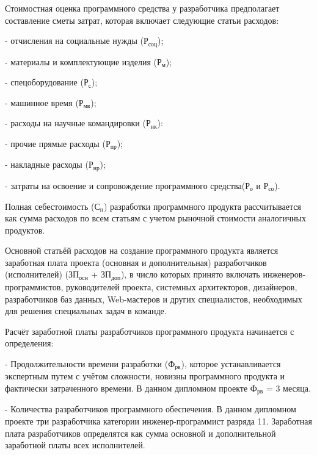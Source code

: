 \subtitlespace

{\gostFont
	
	\par \redline Стоимостная оценка программного средства у разработчика предполагает составление сметы затрат, которая включает следующие статьи расходов:
	
	\par \redline -	отчисления на социальные нужды ($\textrm{Р}_{\textrm{соц}}$);
	\par \redline -	материалы и комплектующие изделия ($\textrm{Р}_{\textrm{м}}$);
	\par \redline -	спецоборудование ($\textrm{Р}_{\textrm{с}}$);
	\par \redline -	машинное время ($\textrm{Р}_{\textrm{мв}}$);
	\par \redline -	расходы на научные командировки ($\textrm{Р}_{\textrm{нк}}$):
	\par \redline -	прочие прямые расходы ($\textrm{Р}_{\textrm{пр}}$);
	\par \redline -	накладные расходы ($\textrm{Р}_{\textrm{нр}}$);
	\par \redline -	затраты на освоение и сопровождение программного средства($\textrm{Р}_{\textrm{о}}$ и $\textrm{Р}_{\textrm{со}}$).
	
	\par \redline Полная себестоимость ($\textrm{С}_{\textrm{п}}$) разработки программного продукта рассчитывается как сумма расходов по всем статьям с учетом рыночной стоимости аналогичных продуктов.
	
	\par \redline Основной статьёй расходов на создание программного продукта является заработная плата проекта (основная и дополнительная) разработчиков (исполнителей) ($\textrm{ЗП}_{\textrm{осн}}$ + $\textrm{ЗП}_{\textrm{доп}}$), в число которых принято включать инженеров-программистов, руководителей проекта, системных архитекторов, дизайнеров, разработчиков баз данных, Web-мастеров и  других специалистов, необходимых для решения специальных задач в команде.
	
	\par \redline Расчёт заработной платы разработчиков программного продукта начинается с определения:
	\par \redline -	Продолжительности времени разработки ($\textrm{Ф}_{\textrm{рв}}$), которое устанавливается экспертным путем с учётом сложности, новизны программного продукта и фактически затраченного времени. В данном дипломном проекте $\textrm{Ф}_{\textrm{рв}}$ = 3 месяца.
	\par \redline -	Количества разработчиков программного обеспечения. В данном дипломном проекте три разработчика категории инженер-программист разряда 11. Заработная плата разработчиков определятся как сумма основной и дополнительной заработной платы всех исполнителей.
	
}
